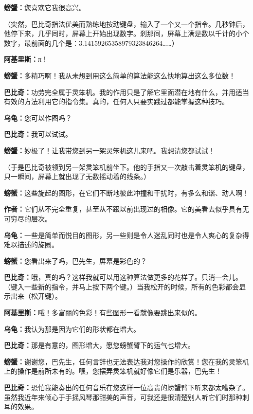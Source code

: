 \documentclass[
  12pt,
  twoside,
  openright,
  oldfontcommands,
]{memoir}
\newcommand{\kaitismall}[1]{{\kaitifamily\small #1}}
\newcommand{\dialogname}[1]{{\sffamily\bfseries #1}}
\begin{document}
\dialogname{螃蟹：}您喜欢它我很高兴。

（突然，巴比奇指法优美而熟练地按动键盘，输入了一个又一个指令。几秒钟后，他停下来，几乎同时，屏幕上开始出现数字。刹那间，屏幕上满是数以千计的小个数字，最前面的几个是：3.14159265358979323846264\ldots\ldots）

\dialogname{阿基里斯：}π！

\dialogname{螃蟹：}多精巧啊！我从未想到用这么简单的算法能这么快地算出这么多位数！

\dialogname{巴比奇：}功劳完全属于灵笨机。我的作用只是了解它里面潜在地有什么，并用适当有效的方法利用它的指令集。真的，任何人只要实践过都能掌握这种技巧。

\dialogname{乌龟：}您可以作图吗？

\dialogname{巴比奇：}我可以试试。

\dialogname{螃蟹：}妙极了！让我带您到另一架灵笨机这儿来吧。我想请您都试试！

（于是巴比奇被领到另一架灵笨机前坐下。他的手指又一次敲击着灵笨机的键盘，只一瞬间，屏幕上就出现了无数摇动着的线条。）

\dialogname{螃蟹：}这些旋起的图形，在它们不断地彼此冲撞和干扰时，有多么和谐、动人啊！

\dialogname{作者：}它们从不完全重复，甚至从不跟以前出现过的相像。它的美看去似乎具有无可穷尽的层次。

\dialogname{乌龟：}一些是简单而悦目的图形，另一些则是令人迷乱同时也是令人爽心的复杂得难以描述的旋圈。

\dialogname{螃蟹：}您看出来了吗，巴先生，屏幕是彩色的？

\dialogname{巴比奇：}哦，真的吗？这样我就可以用这种算法做更多的花样了。只消一会儿。\kaitismall{（键入一些新的指令，并马上按下两个键。）}当我松开的时候，所有的色彩都会显示出来\kaitismall{（松开键）}。

\dialogname{阿基里斯：}哦！多富丽的色彩！有些图形一看就像要跳出来似的。

\dialogname{乌龟：}我认为那是因为它们的形状都在增大。

\dialogname{巴比奇：}那是有意的，图形增大，愿您螃蟹臂下的运气也增大。

\dialogname{螃蟹：}谢谢您，巴先生，任何言辞也无法表达我对您操作的欣赏！您在我的灵笨机上的操作是前所未有的。嘿，您摆弄灵笨机就好像它们是乐器，巴先生！

\dialogname{巴比奇：}恐怕我能奏出的任何音乐在您这样一位高贵的螃蟹臂下听来都太嘈杂了。虽然我近年来倾心于手摇风琴那甜美的声音，可我还是很清楚别人听它们时那种刺耳的效果。
\end{document}
